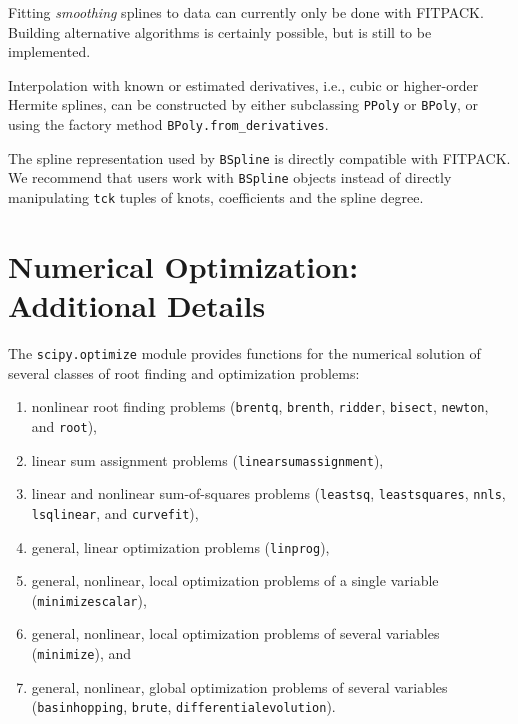 \documentclass[fleqn,10pt]{wlscirep}
\newcommand{\code}[1]{\texttt{#1}}
\begin{document}
Fitting \emph{smoothing} splines to data can currently only be done with 
FITPACK. Building alternative algorithms is certainly possible,
but is still to be implemented.

Interpolation with known or estimated derivatives, i.e., cubic or
higher-order Hermite splines, can be constructed by either
subclassing \code{PPoly} or \code{BPoly}, or using the factory
method \code{BPoly.from\_derivatives}.

The spline representation used by \code{BSpline} is directly
compatible with FITPACK. We recommend that users work with
\code{BSpline} objects instead of directly manipulating \code{tck}
tuples of knots, coefficients and the spline degree.

\section*{Numerical Optimization: Additional Details}
The \texttt{scipy.optimize} module provides functions for the numerical solution of several classes of root finding and optimization problems:
\begin{enumerate}
\item nonlinear root finding problems (\texttt{brentq}, \texttt{brenth}, \texttt{ridder}, \texttt{bisect}, \texttt{newton}, and \texttt{root}),
\item linear sum assignment problems (\texttt{linear\textunderscore sum\textunderscore assignment}),
\item linear and nonlinear sum-of-squares problems (\texttt{leastsq}, \texttt{least\textunderscore squares}, \texttt{nnls}, \texttt{lsq\textunderscore linear}, and \texttt{curve\textunderscore fit}),
\item general, linear optimization problems (\texttt{linprog}),
\item general, nonlinear, local optimization problems of a single variable (\texttt{minimize\textunderscore scalar}),
\item general, nonlinear, local optimization problems of several variables (\texttt{minimize}), and
\item general, nonlinear, global optimization problems of several variables (\texttt{basinhopping}, \texttt{brute}, \texttt{differential\textunderscore evolution}).
\end{enumerate}
\end{document}

